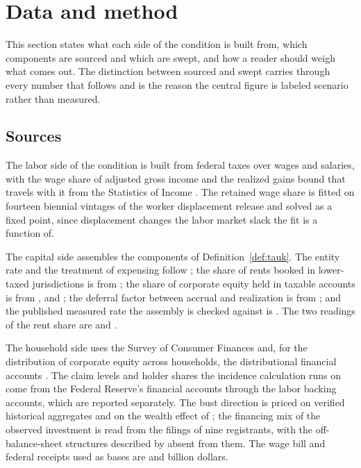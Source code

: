 \section{Data and method}
\label{sec:data}

This section states what each side of the condition is built from, which components are sourced
and which are swept, and how a reader should weigh what comes out. The distinction between
sourced and swept carries through every number that follows and is the reason the central figure
is labeled scenario rather than measured.

\subsection{Sources}

The labor side of the condition is built from federal taxes over wages and salaries, with the
wage share of adjusted gross income and the realized gains bound that travels with it from the
Statistics of Income \citep{IRSSOI}. The retained wage share is fitted on fourteen biennial
vintages of the worker displacement release \citep{BLSWorkerDisplacement} and solved as a fixed
point, since displacement changes the labor market slack the fit is a function of.

The capital side assembles the components of Definition~\ref{def:tauk}. The entity rate and
the treatment of expensing follow \citet{AcemogluManeraRestrepo2020}; the share of rents booked
in lower-taxed jurisdictions is from \citet{TorslovWierZucman2023}; the share of corporate equity
held in taxable accounts is from \citet{RosenthalAustin2016}, \citet{RosenthalBurke2020} and
\citet{RosenthalMucciolo2024}; the deferral factor between accrual and realization is from
\citet{Gravelle2022}; and the published measured rate the assembly is checked against is
\citet{CBO2014}. The two readings of the rent share are \citet{Barkai2020} and
\citet{KarabarbounisNeiman2014}.

The household side uses the Survey of Consumer Finances \citep{FRBSCF} and, for the distribution
of corporate equity across households, the distributional financial accounts \citep{FRBDFA}. The
claim levels and holder shares the incidence calculation runs on come from the Federal Reserve's
financial accounts \citep{FRBZ1} through the labor backing accounts, which are reported
separately. The bust direction is priced on verified historical aggregates and on the wealth
effect of \citet{ChodorowReichNenovSimsek2021}; the financing mix of the observed investment is
read from the filings of nine registrants, with the off-balance-sheet structures described by
\citet{BIS2026} absent from them. The wage bill and federal receipts used as bases are
 and  billion dollars.

